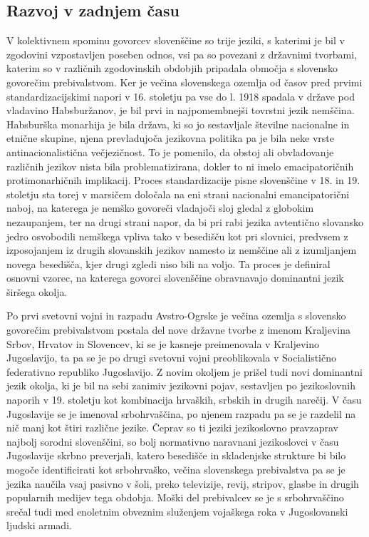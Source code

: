 \begin{multicols}{2}
\subsection{Razvoj v zadnjem času}

V kolektivnem spominu govorcev slovenščine so trije jeziki, s katerimi je bil v zgodovini vzpostavljen poseben odnos, vsi pa so povezani z državnimi tvorbami, katerim so v različnih zgodovinskih obdobjih pripadala območja s slovensko govorečim prebivalstvom. Ker je večina slovenskega ozemlja od časov pred prvimi standardizacijskimi napori v 16. stoletju pa vse do l. 1918 spadala v države pod vladavino Habsburžanov, je bil prvi in najpomembnejši tovrstni jezik nemščina. Habsburška monarhija je bila država, ki so jo sestavljale številne nacionalne in etnične skupine, njena prevladujoča jezikovna politika pa je bila neke vrste antinacionalistična večjezičnost. To je pomenilo, da obstoj ali obvladovanje različnih jezikov nista bila problematizirana, dokler to ni imelo emacipatoričnih protimonarhičnih implikacij. Proces standardizacije pisne slovenščine v 18. in 19. stoletju sta torej v marsičem določala na eni strani nacionalni emancipatorični naboj, na katerega je nemško govoreči vladajoči sloj gledal z globokim nezaupanjem, ter na drugi strani napor, da bi pri rabi jezika avtentično slovansko jedro osvobodili nemškega vpliva tako v besedišču kot pri slovnici, predvsem z izposojanjem iz drugih slovanskih jezikov namesto iz nemščine ali z izumljanjem novega besedišča, kjer drugi zgledi niso bili na voljo. Ta proces je definiral osnovni vzorec, na katerega govorci slovenščine obravnavajo dominantni jezik širšega okolja.

Po prvi svetovni vojni in razpadu Avstro-Ogrske je večina ozemlja s slovensko govorečim prebivalstvom postala del nove državne tvorbe z imenom Kraljevina Srbov, Hrvatov in Slovencev, ki se je kasneje preimenovala v Kraljevino Jugoslavijo, ta pa se je po drugi svetovni vojni preoblikovala v Socialistično federativno republiko Jugoslavijo. Z novim okoljem je prišel tudi novi dominantni jezik okolja, ki je bil na sebi zanimiv jezikovni pojav, sestavljen po jezikoslovnih naporih v 19. stoletju kot kombinacija hrvaških, srbskih in drugih narečij. V času Jugoslavije se je imenoval srbohrvaščina, po njenem razpadu pa se je razdelil na nič manj kot štiri različne jezike. Čeprav so ti jeziki jezikoslovno pravzaprav najbolj sorodni slovenščini, so bolj normativno naravnani jezikoslovci v času Jugoslavije skrbno preverjali, katero besedišče in skladenjske strukture bi bilo mogoče identificirati kot srbohrvaško, večina slovenskega prebivalstva pa se je jezika naučila vsaj pasivno v šoli, preko televizije, revij, stripov, glasbe in drugih popularnih medijev tega obdobja. Moški del prebivalcev se je s srbohrvaščino srečal tudi med enoletnim obveznim služenjem vojaškega roka v Jugoslovanski ljudski armadi.


\end{multicols}
